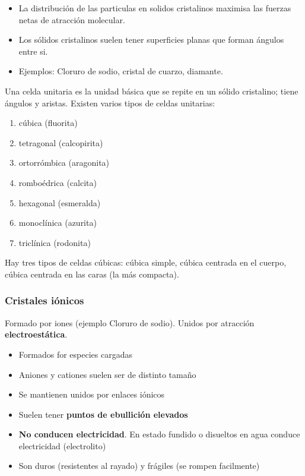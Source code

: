 \documentclass[]{article}
\begin{document}
\begin{itemize}
	\item La distribución de las particulas en solidos cristalinos maximisa las fuerzas netas de atracción molecular.
	\item Los sólidos cristalinos suelen tener superficies planas que forman ángulos entre si.
	\item Ejemplos: Cloruro de sodio, cristal de cuarzo, diamante.
\end{itemize}

Una celda unitaria es la unidad básica que se repite en un sólido cristalino; tiene ángulos y aristas. Existen varios tipos de celdas unitarias:

\begin{enumerate}
	\item cúbica (fluorita)
	\item tetragonal (calcopirita)
	\item ortorrómbica (aragonita)
	\item romboédrica (calcita)
	\item hexagonal (esmeralda)
	\item monoclínica (azurita)
	\item triclínica (rodonita)
\end{enumerate}

Hay tres tipos de celdas cúbicas: cúbica simple, cúbica centrada en el cuerpo, cúbica centrada en las caras (la más compacta).



\subsubsection{Cristales iónicos}
Formado por iones (ejemplo Cloruro de sodio). Unidos por atracción \textbf{electroestática}.

\begin{itemize}
	\item Formados for especies cargadas
	\item Aniones y cationes suelen ser de distinto tamaño
	\item Se mantienen unidos por enlaces iónicos
	\item Suelen tener \textbf{puntos de ebullición elevados}
	\item \textbf{No conducen electricidad}. En estado fundido o disueltos en agua conduce electricidad (electrolito)
	\item Son duros (resistentes al rayado) y frágiles (se rompen facilmente)
\end{itemize}
\end{document}
